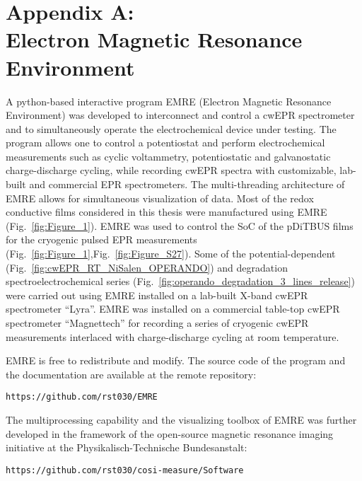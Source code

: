 \chapter*{Appendix A:\\Electron Magnetic Resonance Environment}
A python-based interactive program EMRE (Electron Magnetic Resonance Environment) was developed to interconnect and control a cwEPR spectrometer and to simultaneously operate the electrochemical device under testing. The program allows one to control a potentiostat and perform electrochemical measurements such as cyclic voltammetry, potentiostatic and galvanostatic charge-discharge cycling, while recording cwEPR spectra with customizable, lab-built and commercial EPR spectrometers. The multi-threading architecture of EMRE allows for simultaneous visualization of data. Most of the redox conductive films considered in this thesis were manufactured using EMRE (Fig.~\ref{fig:Figure_1}). EMRE was used to control the SoC of the pDiTBUS films for the cryogenic pulsed EPR measurements (Fig.~\ref{fig:Figure_1},Fig.~\ref{fig:Figure_S27}). Some of the potential-dependent (Fig.~\ref{fig:cwEPR_RT_NiSalen_OPERANDO}) and degradation spectroelectrochemical series (Fig.~\ref{fig:operando_degradation_3_lines_release}) were carried out using EMRE installed on a lab-built X-band cwEPR spectrometer ``Lyra''.  EMRE was installed on a commercial table-top cwEPR spectrometer ``Magnettech'' for recording a series of cryogenic cwEPR measurements interlaced with charge-discharge cycling at room temperature.\\ 

\par
EMRE is free to redistribute and modify. The source code of the program and the documentation are available at the remote repository:\\ 

\par
\texttt{https://github.com/rst030/EMRE}\\
 
\par
The multiprocessing capability and the visualizing toolbox of EMRE was further developed in the framework of the open-source magnetic resonance imaging initiative at the Physikalisch-Technische Bundesanstalt:\\

\par
\texttt{https://github.com/rst030/cosi-measure/Software}